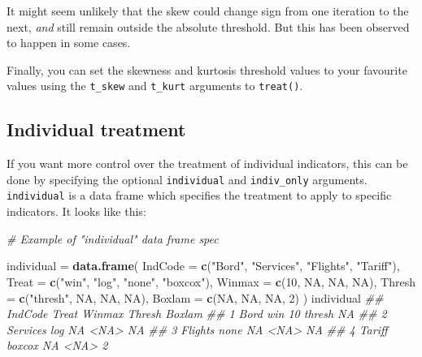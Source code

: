 \documentclass[
]{book}
\newenvironment{Shaded}{\begin{snugshade}}{\end{snugshade}}
\newcommand{\CommentTok}[1]{\textcolor[rgb]{0.56,0.35,0.01}{\textit{#1}}}
\newcommand{\DataTypeTok}[1]{\textcolor[rgb]{0.13,0.29,0.53}{#1}}
\newcommand{\DecValTok}[1]{\textcolor[rgb]{0.00,0.00,0.81}{#1}}
\newcommand{\KeywordTok}[1]{\textcolor[rgb]{0.13,0.29,0.53}{\textbf{#1}}}
\newcommand{\NormalTok}[1]{#1}
\newcommand{\OtherTok}[1]{\textcolor[rgb]{0.56,0.35,0.01}{#1}}
\newcommand{\StringTok}[1]{\textcolor[rgb]{0.31,0.60,0.02}{#1}}
\begin{document}
It might seem unlikely that the skew could change sign from one iteration to the next, \emph{and} still remain outside the absolute threshold. But this has been observed to happen in some cases.

Finally, you can set the skewness and kurtosis threshold values to your favourite values using the \texttt{t\_skew} and \texttt{t\_kurt} arguments to \texttt{treat()}.

\hypertarget{individual-treatment}{%
\subsection{Individual treatment}\label{individual-treatment}}

If you want more control over the treatment of individual indicators, this can be done by specifying the optional \texttt{individual} and \texttt{indiv\_only} arguments. \texttt{individual} is a data frame which specifies the treatment to apply to specific indicators. It looks like this:

\begin{Shaded}
\begin{Highlighting}[]
\CommentTok{# Example of "individual" data frame spec}

\NormalTok{individual =}\StringTok{ }\KeywordTok{data.frame}\NormalTok{(}
  \DataTypeTok{IndCode =} \KeywordTok{c}\NormalTok{(}\StringTok{"Bord"}\NormalTok{, }\StringTok{"Services"}\NormalTok{, }\StringTok{"Flights"}\NormalTok{, }\StringTok{"Tariff"}\NormalTok{),}
  \DataTypeTok{Treat =} \KeywordTok{c}\NormalTok{(}\StringTok{"win"}\NormalTok{, }\StringTok{"log"}\NormalTok{, }\StringTok{"none"}\NormalTok{, }\StringTok{"boxcox"}\NormalTok{),}
  \DataTypeTok{Winmax =} \KeywordTok{c}\NormalTok{(}\DecValTok{10}\NormalTok{, }\OtherTok{NA}\NormalTok{, }\OtherTok{NA}\NormalTok{, }\OtherTok{NA}\NormalTok{),}
  \DataTypeTok{Thresh =} \KeywordTok{c}\NormalTok{(}\StringTok{"thresh"}\NormalTok{, }\OtherTok{NA}\NormalTok{, }\OtherTok{NA}\NormalTok{, }\OtherTok{NA}\NormalTok{),}
  \DataTypeTok{Boxlam =} \KeywordTok{c}\NormalTok{(}\OtherTok{NA}\NormalTok{, }\OtherTok{NA}\NormalTok{, }\OtherTok{NA}\NormalTok{, }\DecValTok{2}\NormalTok{)}
\NormalTok{)}
\NormalTok{individual}
\CommentTok{##    IndCode  Treat Winmax Thresh Boxlam}
\CommentTok{## 1     Bord    win     10 thresh     NA}
\CommentTok{## 2 Services    log     NA   <NA>     NA}
\CommentTok{## 3  Flights   none     NA   <NA>     NA}
\CommentTok{## 4   Tariff boxcox     NA   <NA>      2}
\end{Highlighting}
\end{Shaded}
\end{document}
